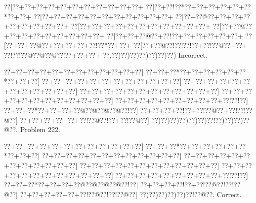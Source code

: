 \documentclass[a5paper]{article}
\begin{document}
\begin{center}
{\goo
\0??[\0??+\0??+\0??+\0??+\0??+\0??+\0??+\0??+\0??+\0??+\0??+
\0??[\0??+\0??!\0??*\0??+\0??+\0??+\0??+\0??+\0??*\0??+\0??+
\0??[\0??+\0??+\0??+\0??+\0??+\0??+\0??+\0??+\0??+\0??+\0??+
\0??[\0??+\0??@\0??+\0??+\0??+\0??+\0??+\0??+\0??+\0??+\0??+
\0??[\0??+\0??+\0??+\0??+\0??+\0??+\0??+\0??+\0??+\0??+\0??+
\0??[\0??+\0??@\0??+\0??+\0??+\0??+\0??+\0??+\0??+\0??+\0??+
\0??[\0??+\0??+\0??@\0??+\0??!\0??+\0??+\0??+\0??+\0??+\0??+
\0??[\0??+\0??+\0??@\0??+\0??+\0??+\0??+\0??!\0??*\0??+\0??+
\0??[\0??+\0??@\0??!\0??!\0??!\0??+\0??!\0??@\0??+\0??+
\0??!\0??!\0??@\0??@\0??@\0??!\0??+\0??+\0??+
\0??,\0??)\0??)\0??)\0??)\0??)\0??)\0??)
}
Incorrect. 

\end{center}
\newpage
\begin{center}
{\goo
\0??+\0??+\0??+\0??+\0??+\0??+\0??+\0??+\0??+\0??+\0??+\0??]
\0??+\0??+\0??*\0??+\0??+\0??+\0??+\0??+\0??*\0??+\0??+\0??]
\0??+\0??+\0??+\0??+\0??+\0??+\0??+\0??+\0??+\0??+\0??+\0??]
\0??+\0??+\0??+\0??+\0??+\0??+\0??+\0??+\0??+\0??+\0??+\0??]
\0??+\0??+\0??+\0??+\0??+\0??+\0??+\0??+\0??+\0??+\0??+\0??]
\0??+\0??+\0??+\0??+\0??+\0??+\0??+\0??+\0??+\0??+\0??+\0??]
\0??+\0??+\0??+\0??+\0??+\0??+\0??+\0??+\0??+\0??!\0??!\0??]
\0??+\0??+\0??*\0??+\0??+\0??+\0??@\0??@\0??@\0??@\0??!\0??]
\0??+\0??+\0??+\0??!\0??+\0??!\0??@\0??+\0??!\0??!\0??@\0??]
\0??+\0??+\0??+\0??+\0??+\0??!\0??@\0??!\0??+\0??!\0??@\0??]
\0??)\0??)\0??)\0??)\0??)\0??)\0??!\0??)\0??)\0??)\0??@\0??.
}
Problem 222.

\end{center}
\begin{center}
{\goo
\0??+\0??+\0??+\0??+\0??+\0??+\0??+\0??+\0??+\0??+\0??+\0??]
\0??+\0??+\0??*\0??+\0??+\0??+\0??+\0??+\0??*\0??+\0??+\0??]
\0??+\0??+\0??+\0??+\0??+\0??+\0??+\0??+\0??+\0??+\0??+\0??]
\0??+\0??+\0??+\0??+\0??+\0??+\0??+\0??+\0??+\0??+\0??+\0??]
\0??+\0??+\0??+\0??+\0??+\0??+\0??+\0??+\0??+\0??+\0??+\0??]
\0??+\0??+\0??+\0??+\0??+\0??+\0??+\0??+\0??+\0??+\0??+\0??]
\0??+\0??+\0??+\0??+\0??+\0??+\0??+\0??+\0??+\0??!\0??!\0??]
\0??+\0??+\0??*\0??+\0??+\0??+\0??@\0??@\0??@\0??@\0??!\0??]
\0??+\0??+\0??+\0??!\0??+\0??!\0??@\0??!\0??!\0??@\0??]
\0??+\0??+\0??+\0??+\0??+\0??!\0??@\0??!\0??!\0??@\0??]
\0??)\0??)\0??)\0??)\0??)\0??!\0??@\0??.
}
Correct. 

\end{center}
\end{document}
